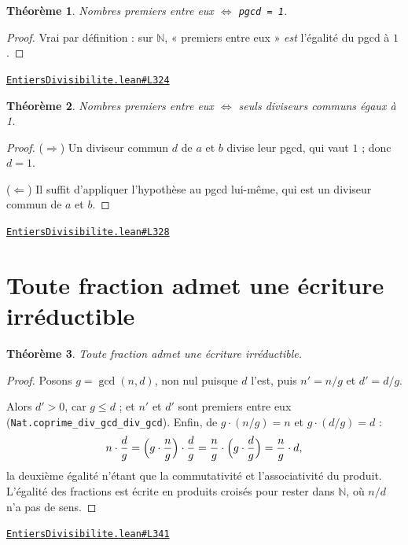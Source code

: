 \documentclass[11pt,a4paper]{article}
\theoremstyle{definition}
\theoremstyle{plain}
\newtheorem{theoreme}{Théorème}
\newcommand{\source}[2]{\par\smallskip\noindent\hfill{\footnotesize\href{#1}{\texttt{#2}}}\par\smallskip}
\begin{document}
\begin{theoreme}
Nombres premiers entre eux \(\iff\) \texttt{pgcd = 1}.
\end{theoreme}

\begin{proof}
Vrai par définition : sur $\mathbb{N}$, « premiers entre eux » \emph{est} l'égalité du
pgcd à $1$.
\end{proof}

\source{https://github.com/Commutator-IO/learn-lean/blob/main/cours/01-college/05-nombres-et-calculs/EntiersDivisibilite.lean\#L324}{EntiersDivisibilite.lean\#L324}

\begin{theoreme}
Nombres premiers entre eux \(\iff\) seuls diviseurs communs égaux à 1.
\end{theoreme}

\begin{proof}
($\Rightarrow$) Un diviseur commun $d$ de $a$ et $b$ divise leur pgcd, qui vaut $1$ ;
donc $d = 1$.

($\Leftarrow$) Il suffit d'appliquer l'hypothèse au pgcd lui-même, qui est un diviseur
commun de $a$ et $b$.
\end{proof}

\source{https://github.com/Commutator-IO/learn-lean/blob/main/cours/01-college/05-nombres-et-calculs/EntiersDivisibilite.lean\#L328}{EntiersDivisibilite.lean\#L328}

\section{Toute fraction admet une écriture irréductible}

\begin{theoreme}
Toute fraction admet une écriture irréductible.
\end{theoreme}

\begin{proof}
Posons $g = \gcd(n,d)$, non nul puisque $d$ l'est, puis $n' = n/g$ et $d' = d/g$.

Alors $d' > 0$, car $g \le d$ ; et $n'$ et $d'$ sont premiers entre eux
(\texttt{Nat.coprime\_div\_gcd\_div\_gcd}). Enfin, de $g \cdot (n/g) = n$ et
$g \cdot (d/g) = d$ :
\[
n \cdot \frac{d}{g}
 = \Bigl(g \cdot \frac{n}{g}\Bigr) \cdot \frac{d}{g}
 = \frac{n}{g} \cdot \Bigl(g \cdot \frac{d}{g}\Bigr)
 = \frac{n}{g} \cdot d ,
\]
la deuxième égalité n'étant que la commutativité et l'associativité du produit. L'égalité
des fractions est écrite en produits croisés pour rester dans $\mathbb{N}$, où $n/d$ n'a
pas de sens.
\end{proof}

\source{https://github.com/Commutator-IO/learn-lean/blob/main/cours/01-college/05-nombres-et-calculs/EntiersDivisibilite.lean\#L341}{EntiersDivisibilite.lean\#L341}
\end{document}
